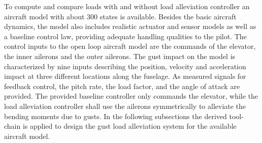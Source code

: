 \documentclass[graybox]{svmult}
\begin{document}
To  compute and compare loads with  and without load alleviation controller an aircraft model with about 300 states  is available. Besides the basic aircraft dynamics, the model also includes realistic actuator and sensor models as well as a baseline control law, providing adequate handling qualities to the pilot.
The control inputs to the open loop aircraft model are the  commands of the elevator, the inner ailerons and the outer ailerons. 
The gust impact on the model is characterized by  nine inputs describing the position, velocity and acceleration impact at three different locations along the fuselage.
As measured signals for feedback control, the pitch rate, the load factor,  and the angle of attack are provided.
The provided baseline controller only commands the elevator, while  the load alleviation controller shall use the ailerons symmetrically to alleviate the bending moments due to gusts.
In the following subsections the derived tool-chain is applied to design the gust load alleviation system for the available aircraft model.

\end{document}
